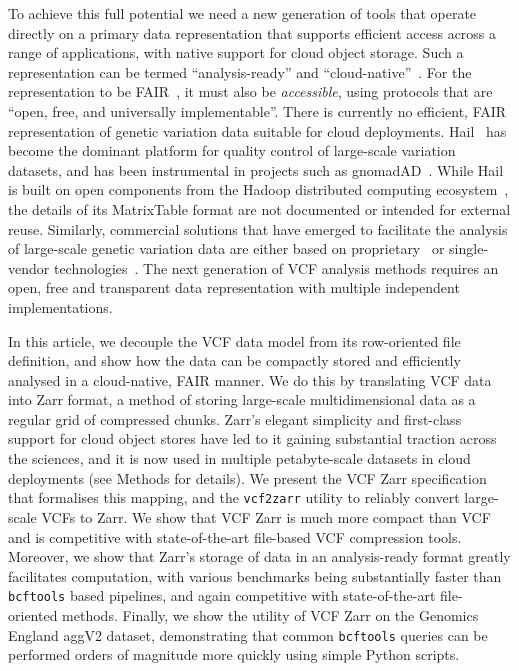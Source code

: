 \documentclass[a4paper,num-refs]{oup-contemporary}
\begin{document}
To achieve this full potential we 
need a new generation of tools that operate directly
on a primary data representation that supports 
efficient access across a range of applications,
with native support for cloud object storage.
Such a representation can be termed ``analysis-ready''
and ``cloud-native''~\citep{abernathey2021cloud}.
For the representation to be FAIR~\citep{wilkinson2016fair},
it must also be \emph{accessible}, using protocols that are 
``open, free, and universally implementable''.
There is currently no efficient, FAIR representation of genetic variation
data suitable for cloud deployments.
Hail~\cite{ganna2016ultra,hail2024} has become the dominant platform
for quality control of large-scale variation datasets, 
and has been instrumental in projects such as 
gnomadAD~\cite{karczewski2020mutational,chen2024genomic}.
While Hail is built on open components
from the Hadoop distributed computing ecosystem~\citep{white2012hadoop},
the details of its MatrixTable format are not documented
or intended for external reuse. 
Similarly, commercial solutions that have emerged to facilitate
the analysis of large-scale genetic variation data are either
based on proprietary~\cite{basespace2024,graf2024,googlelifesciences2024,
awshealthomics2024,microsoftgenomics2024}
or single-vendor technologies~\cite[e.g.][]{tiledb2024,genomicsdb2024}.
The next generation of VCF analysis methods requires
an open, free and transparent data representation 
with multiple independent implementations.

In this article, we decouple the VCF data model from its row-oriented
file definition, and show how the data can be 
compactly stored and efficiently analysed in a cloud-native, FAIR manner.
We do this by translating VCF data into Zarr format,
a method of storing large-scale multidimensional data as a regular
grid of compressed chunks. 
Zarr's elegant simplicity and first-class support for 
cloud object stores have led to 
it gaining substantial traction
across the sciences, and it is now used in multiple petabyte-scale
datasets in cloud deployments (see Methods for details).
We present the VCF Zarr specification that formalises this 
mapping, and the \texttt{vcf2zarr} 
utility to reliably convert large-scale VCFs to Zarr.
We show that VCF Zarr is much more compact than 
VCF and is competitive with state-of-the-art
file-based VCF compression tools. 
Moreover, we show that Zarr's storage of data in an analysis-ready 
format greatly facilitates computation,
with various benchmarks being substantially faster than
\texttt{bcftools} based pipelines, and again competitive
with state-of-the-art file-oriented methods. Finally, we show the 
utility of VCF Zarr on the Genomics England aggV2 dataset,
demonstrating that common \texttt{bcftools} queries can be performed orders
of magnitude more quickly using simple Python scripts.
\end{document}
